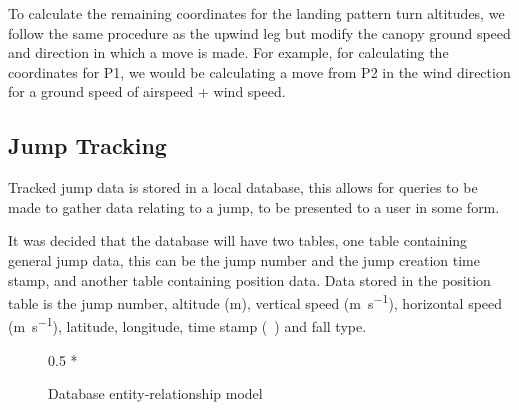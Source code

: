 To calculate the remaining coordinates for the landing pattern turn altitudes, we follow the same procedure as the upwind leg but modify the canopy ground speed and direction in which a move is made. For example, for calculating the coordinates for P1, we would be calculating a move from P2 in the wind direction for a ground speed of airspeed + wind speed.

\subsection{Jump Tracking}
Tracked jump data is stored in a local database, this allows for queries to be made to gather data relating to a jump, to be presented to a user in some form.

It was decided that the database will have two tables, one table containing general jump data, this can be the jump number and the jump creation time stamp, and another table containing position data. Data stored in the position table is the jump number, altitude (\si{\metre}), vertical speed (\si{\metre\per\second}), horizontal speed (\si{\metre\per\second}), latitude, longitude, time stamp (\si{\milli\sec}) and fall type.

\begin{figure}[ht]
  \centering
  \begin{scaletikzpicturetowidth}{0.5 * \linewidth}
  \end{scaletikzpicturetowidth}
  \caption{Database entity-relationship model}\label{fig:database-relations}
\end{figure}

